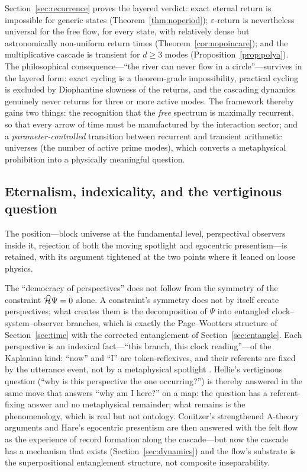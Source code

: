 Section~\ref{sec:recurrence} proves the layered verdict: exact eternal return is
impossible for generic states (Theorem~\ref{thm:noperiod}); $\varepsilon$-return is
nevertheless universal for the free flow, for every state, with relatively dense but
astronomically non-uniform return times (Theorem~\ref{cor:nopoincare}); and the
multiplicative cascade is transient for $d\geq3$ modes (Proposition~\ref{prop:polya}). The
philosophical consequence---``the river can never flow in a
circle''---survives in the layered form: exact cycling is a theorem-grade impossibility,
practical cycling is excluded by Diophantine slowness of the returns, and the cascading
dynamics genuinely never returns for three or more active modes. The framework thereby gains
two things: the recognition that the \emph{free} spectrum is maximally
recurrent, so that every arrow of time must be manufactured by the interaction sector; and a
\emph{parameter-controlled} transition between recurrent and transient arithmetic universes
(the number of active prime modes), which converts a metaphysical prohibition into a
physically meaningful question.

\subsection{Eternalism, indexicality, and the vertiginous question}

The position---block universe at the fundamental level, perspectival observers
inside it, rejection of both the moving spotlight and egocentric presentism---is retained,
with its argument tightened at the two points where it leaned on loose physics.

\begin{remark}
The ``democracy of perspectives'' does not follow from the symmetry of
the constraint $\widehat{\mathcal{H}}\Psi=0$ alone. A constraint's symmetry does not by itself create
perspectives; what creates them is the decomposition of $\Psi$ into entangled
clock--system--observer branches, which is exactly the Page--Wootters structure of
Section~\ref{sec:time} with the corrected entanglement of Section~\ref{sec:entangle}.
Each perspective is an indexical fact---``this branch, this clock reading''---of the
Kaplanian kind: ``now'' and ``I'' are token-reflexives, and their referents are fixed by
the utterance event, not by a metaphysical spotlight \cite{kaplan1989}. Hellie's vertiginous
question (``why is this perspective the one occurring?'') \cite{hellie2013} is thereby
answered in the same move that answers ``why am I here?'' on a map: the question has a
referent-fixing answer and no metaphysical remainder; what remains is the phenomenology,
which is real but not ontology. Conitzer's strengthened A-theory arguments
\cite{conitzer2019} and Hare's egocentric presentism \cite{hare2009} are then answered
with the felt flow as the experience of record formation
along the cascade---but now the cascade has a mechanism that exists
(Section~\ref{sec:dynamics}) and the flow's substrate is the superpositional entanglement
structure, not composite inseparability.
\end{remark}

